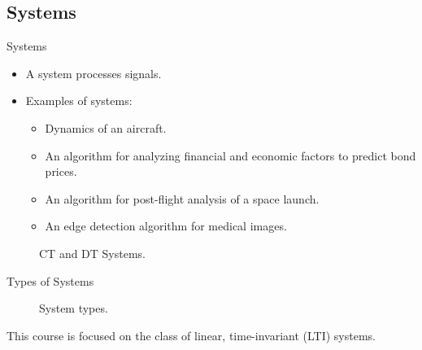 \subsection{Systems}

\begin{frame}{Systems}
    \begin{itemize}[<+->]
        \item A system processes signals.
        \item Examples of systems:
            \begin{itemize}
                \item Dynamics of an aircraft.
                \item An algorithm for analyzing financial and economic factors to predict bond prices.
                \item An algorithm for post-flight analysis of a space launch.
                \item An edge detection algorithm for medical images.
            \end{itemize}
    \end{itemize}
    \pause
    \begin{figure}
        \centering
            
            
        \caption{CT and DT Systems.}\label{fi:ct_dt_systems}
    \end{figure}
\end{frame}


\begin{frame}[plain]{Types of Systems}
    \begin{figure}
        \centering
        
        \caption{System types.}\label{fi:system_types}
    \end{figure}
    This course is focused on the class of linear, time-invariant (LTI) systems.
\end{frame}



